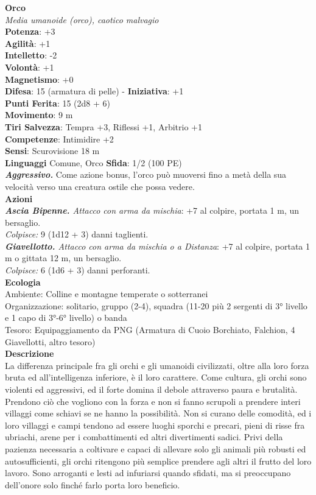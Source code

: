 \begin{multicols}{2}
\medskip\textbf{Orco}\\
\emph{Media umanoide (orco), caotico malvagio}\\
\textbf{Potenza}: +3\\
\textbf{Agilità}: +1\\
\textbf{Intelletto}: -2\\
\textbf{Volontà}: +1\\
\textbf{Magnetismo}: +0\\
\textbf{Difesa}: 15 (armatura di pelle) - \textbf{Iniziativa}: +1\\
\textbf{Punti Ferita}: 15 (2d8 + 6)\\
\textbf{Movimento}: 9 m\\
\textbf{Tiri Salvezza}: Tempra +3, Riflessi +1, Arbitrio +1\\
\textbf{Competenze}: Intimidire +2\\
\textbf{Sensi}: Scurovisione 18 m\\
\textbf{Linguaggi} Comune, Orco \textbf{Sfida}: 1/2 (100 PE)\smallskip\\
\emph{\textbf{Aggressivo.}} Come azione bonus, l'orco può muoversi fino a metà della sua velocità verso una creatura ostile che possa vedere. \\
\smallskip\textbf{Azioni}\\
\emph{\textbf{Ascia Bipenne.} Attacco con arma da mischia}: +7 al colpire, portata 1 m, un bersaglio.\\
\emph{Colpisce:} 9 (1d12 + 3) danni taglienti.\\
\emph{\textbf{Giavellotto.} Attacco con arma da mischia o a Distanza}: +7 al colpire, portata 1 m o gittata 12 m, un bersaglio. \\
\emph{Colpisce:} 6 (1d6 + 3) danni perforanti.\\
\textbf{Ecologia}\\
Ambiente: Colline e montagne temperate o sotterranei\\
Organizzazione: solitario, gruppo (2-4), squadra (11-20 più 2 sergenti di 3° livello e 1 capo di 3°-6° livello) o banda \\
Tesoro: Equipaggiamento da PNG (Armatura di Cuoio Borchiato, Falchion, 4 Giavellotti, altro tesoro)\\
\textbf{Descrizione}\\
La differenza principale fra gli orchi e gli umanoidi civilizzati, oltre alla loro forza bruta ed all'intelligenza inferiore, è il loro carattere. Come cultura, gli orchi sono violenti ed aggressivi, ed il forte domina il debole attraverso paura e brutalità. Prendono ciò che vogliono con la forza e non si fanno scrupoli a prendere interi villaggi come schiavi se ne hanno la possibilità. Non si curano delle comodità, ed i loro villaggi e campi tendono ad essere luoghi sporchi e precari, pieni di risse fra ubriachi, arene per i combattimenti ed altri divertimenti sadici. Privi della pazienza necessaria a coltivare e capaci di allevare solo gli animali più robusti ed autosufficienti, gli orchi ritengono più semplice prendere agli altri il frutto del loro lavoro. Sono arroganti e lesti ad infuriarsi quando sfidati, ma si preoccupano dell’onore solo finché farlo porta loro beneficio.\\


\end{multicols}
